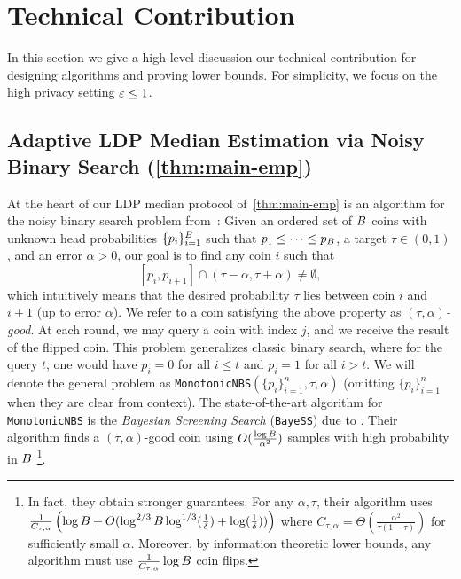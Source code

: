\section{Technical Contribution}\label{sec:tech-contributions}
In this section we give a high-level discussion our technical contribution for designing algorithms and proving lower bounds. For simplicity, we focus on the high privacy setting $\varepsilon\leq 1$.
\subsection{Adaptive LDP Median Estimation via Noisy Binary Search (\cref{thm:main-emp})}\label{sec:tech-contributions-1}
At the heart of our LDP median protocol of~\cref{thm:main-emp} is an algorithm for the noisy binary search problem from~\cite{karp2007noisy}: Given an ordered set of $B$ coins with unknown head probabilities $\{p_i\}_{i=1}^B$ such that $p_1\leq \cdots \leq p_B$, a target $\tau \in (0,1)$, and an error $\alpha>0$, our goal is to find any coin $i$ such that 
\begin{equation}\label{eq:good-coin}
[p_i, p_{i+1}]\cap (\tau-\alpha, \tau+\alpha)\neq \emptyset,
\end{equation}
which intuitively means that the desired probability $\tau$ lies between coin $i$ and $i+1$ (up to error $\alpha$).  
We refer to a coin satisfying the above property as \emph{$(\tau, \alpha)$-good}. At each round, we may query a coin with index $j$, and we receive the result of the flipped coin.
This problem generalizes classic binary search, where for the query $t$, one would have $p_i = 0$ for all $i \leq t$ and $p_i = 1$ for all $i > t$. We will denote the general problem as \texttt{MonotonicNBS}$(\{p_i\}_{i=1}^n, \tau, \alpha)$ (omitting $\{p_i\}_{i=1}^n$ when they are clear from context).
%
The state-of-the-art algorithm for \texttt{MonotonicNBS} is the \emph{Bayesian Screening Search} (\texttt{BayeSS}) due to \cite{gretta2023sharp}. Their algorithm finds a $(\tau,\alpha)$-good coin using $O(\frac{\log B}{\alpha^2})$ samples with high probability in $B$ \footnote{In fact, they obtain stronger guarantees. For any $\alpha,\tau$, their algorithm uses $\frac{1}{C_{\tau,\alpha}}\left(\log B+O(\log^{2/3} B \log^{1/3}(\frac{1}{\delta})+\log(\frac{1}{\delta}))\right)$ where $C_{\tau,\alpha} = \Theta\left(\frac{\alpha^2}{\tau(1-\tau)}\right)$ for sufficiently small $\alpha$.  Moreover, by information theoretic lower bounds, any algorithm must use $\frac{1}{C_{\tau,\alpha}}\log B$ coin flips.}. %

